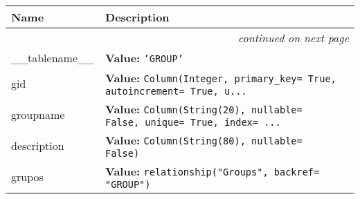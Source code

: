     \vspace{-1cm}
\hspace{\varindent}\begin{longtable}{|p{\varnamewidth}|p{\vardescrwidth}|l}
\cline{1-2}
\cline{1-2} \centering \textbf{Name} & \centering \textbf{Description}& \\
\cline{1-2}
\endhead\cline{1-2}\multicolumn{3}{r}{\small\textit{continued on next page}}\\\endfoot\cline{1-2}
\endlastfoot\raggedright \_\-\_\-t\-a\-b\-l\-e\-n\-a\-m\-e\-\_\-\_\- & \raggedright \textbf{Value:} 
{\tt 'GROUP'}&\\
\cline{1-2}
\raggedright g\-i\-d\- & \raggedright \textbf{Value:} 
{\tt Column(Integer, primary\_key= True, autoincrement= True, u\texttt{...}}&\\
\cline{1-2}
\raggedright g\-r\-o\-u\-p\-n\-a\-m\-e\- & \raggedright \textbf{Value:} 
{\tt Column(String(20), nullable= False, unique= True, index= \texttt{...}}&\\
\cline{1-2}
\raggedright d\-e\-s\-c\-r\-i\-p\-t\-i\-o\-n\- & \raggedright \textbf{Value:} 
{\tt Column(String(80), nullable= False)}&\\
\cline{1-2}
\raggedright g\-r\-u\-p\-o\-s\- & \raggedright \textbf{Value:} 
{\tt relationship("Groups", backref= "GROUP")}&\\
\cline{1-2}
\end{longtable}

